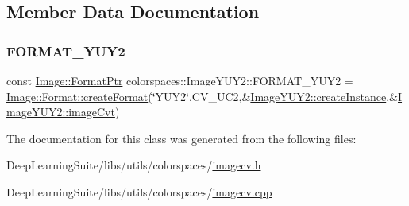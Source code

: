 \subsection{Member Data Documentation}
\mbox{\label{classcolorspaces_1_1_image_y_u_y2_ad78f841cffc31b95f8069cb789e9f0e4}} 
\subsubsection{\texorpdfstring{F\+O\+R\+M\+A\+T\+\_\+\+Y\+U\+Y2}{FORMAT\_YUY2}}
{\footnotesize\ttfamily const \hyperlink{classcolorspaces_1_1_image_ab3978cc7acc2b5e855f8c715f09667d1}{Image\+::\+Format\+Ptr} colorspaces\+::\+Image\+Y\+U\+Y2\+::\+F\+O\+R\+M\+A\+T\+\_\+\+Y\+U\+Y2 = \hyperlink{classcolorspaces_1_1_image_1_1_format_ae79208f237b72cf596331ebcec2ff58b}{Image\+::\+Format\+::create\+Format}(\char`\"{}Y\+U\+Y2\char`\"{},C\+V\+\_\+U\+C2,\&\hyperlink{classcolorspaces_1_1_image_y_u_y2_aa9b60cfc9b469d0e20a3190fa5d91d2e}{Image\+Y\+U\+Y2\+::create\+Instance},\&\hyperlink{classcolorspaces_1_1_image_y_u_y2_aaa26a6af0f8e2f36d35d65a5dcb0a25a}{Image\+Y\+U\+Y2\+::image\+Cvt})\hspace{0.3cm}{\ttfamily [static]}}



The documentation for this class was generated from the following files\+:\begin{DoxyCompactItemize}
\item 
Deep\+Learning\+Suite/libs/utils/colorspaces/\hyperlink{imagecv_8h}{imagecv.\+h}\item 
Deep\+Learning\+Suite/libs/utils/colorspaces/\hyperlink{imagecv_8cpp}{imagecv.\+cpp}\end{DoxyCompactItemize}
